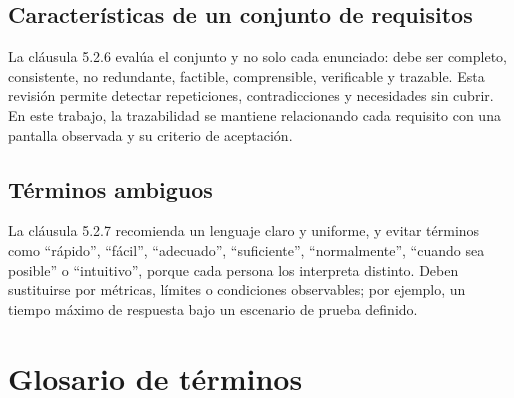 \documentclass[10pt,a4paper]{article}
\begin{document}
	\subsection{Características de un conjunto de requisitos}
	
	La cláusula 5.2.6 \cite{iso29148} evalúa el conjunto y no solo cada enunciado: debe ser completo, consistente, no redundante, factible, comprensible, verificable y trazable. Esta revisión permite detectar repeticiones, contradicciones y necesidades sin cubrir. En este trabajo, la trazabilidad se mantiene relacionando cada requisito con una pantalla observada y su criterio de aceptación.
	
	\subsection{Términos ambiguos}
	
	La cláusula 5.2.7 \cite{iso29148} recomienda un lenguaje claro y uniforme, y evitar términos como ``rápido'', ``fácil'', ``adecuado'', ``suficiente'', ``normalmente'', ``cuando sea posible'' o ``intuitivo'', porque cada persona los interpreta distinto. Deben sustituirse por métricas, límites o condiciones observables; por ejemplo, un tiempo máximo de respuesta bajo un escenario de prueba definido.
	
	\section{Glosario de términos}
	
\end{document}
